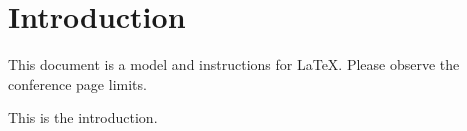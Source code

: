 \section{Introduction}
This document is a model and instructions for \LaTeX.
Please observe the conference page limits. 

This is the introduction.